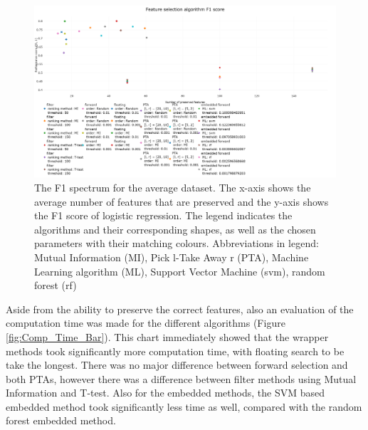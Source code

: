 \documentclass[10pt,a4paper]{report}
\begin{document}
	\begin{figure}[H]
		\centering
		\includegraphics[angle=90,height=1.4\textwidth]{F1_new.png}
		\caption{The F1 spectrum for the average dataset. The x-axis shows the average number of features that are preserved and the y-axis shows the F1 score of logistic regression. The legend indicates the algorithms and their corresponding shapes, as well as the chosen parameters with their matching colours. Abbreviations in legend: Mutual Information (MI), Pick l-Take Away r (PTA), Machine Learning algorithm (ML), Support Vector Machine (svm), random forest (rf)}
		\label{fig:Avg_F1_Spectrum}
	\end{figure}
	
	Aside from the ability to preserve the correct features, also an evaluation of the computation time was made for the different algorithms (Figure \ref{fig:Comp_Time_Bar}). This chart immediately showed that the wrapper methods took significantly more computation time, with floating search to be take the longest. There was no major difference between forward selection and both PTAs, however there was a difference between filter methods using Mutual Information and T-test. Also for the embedded methods, the SVM based embedded method took significantly less time as well, compared with the random forest embedded method.
	
\end{document}
